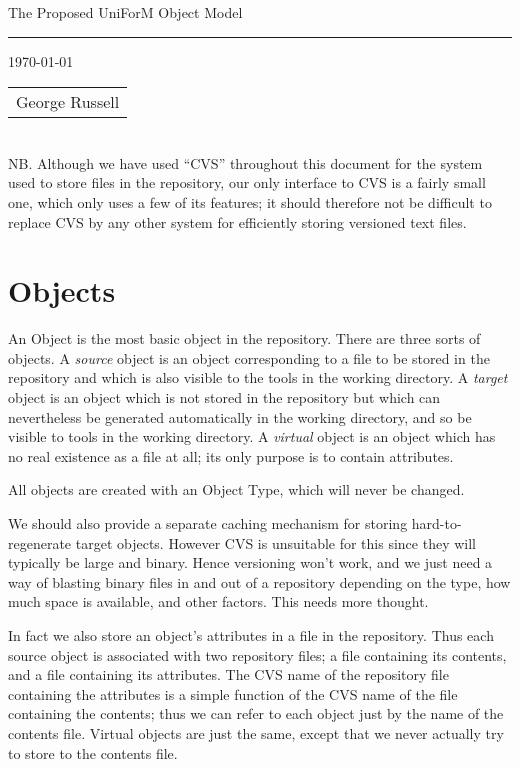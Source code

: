 \documentclass[a4paper]{article}
\begin{document}
{\Large{The Proposed UniForM Object Model}}

\rule{\textwidth}{.2pt} 


\today 
\hfill
\begin{tabular}[t]{l}
George Russell \\
\end{tabular}\\[3ex]
NB.  Although we have used ``CVS'' throughout this document for the
system used to store files in the repository, our only interface to
CVS is a fairly small one, which only uses a few of its features;
it should therefore not be difficult to replace CVS by any other
system for efficiently storing versioned text files.
\section{Objects}
An Object is the most basic object in the repository.  There are
three sorts of objects.  A {\em source} object is an object corresponding
to a file to be stored in the repository and which is also visible to 
the tools in the working directory.  A {\em target} object is an object which
is not stored in the repository but which can nevertheless be
generated automatically in the working directory, and so be visible to
tools in the working directory.  A {\em virtual} object is an object which
has no real existence as a file at all; its only purpose is to contain
attributes.

All objects are created with an Object Type, which will never be changed.

We should also provide a separate caching mechanism for storing 
hard-to-regenerate target objects.  However CVS is unsuitable for this
since they will typically be large and binary.  Hence versioning won't
work, and we just need a way of blasting binary files in and out of a 
repository depending on the type, how much space is available, and other
factors.  This needs more thought.

In fact we also store an object's attributes in a file in the repository.
Thus each source object is associated with two repository files;
a file containing its contents, and a file containing its attributes.
The CVS name of the repository file containing the attributes is a simple
function of the CVS name of the file containing the contents; thus we can
refer to each object just by the name of the contents file.  Virtual
objects are just the same, except that we never actually try to store
to the contents file.
\end{document}
